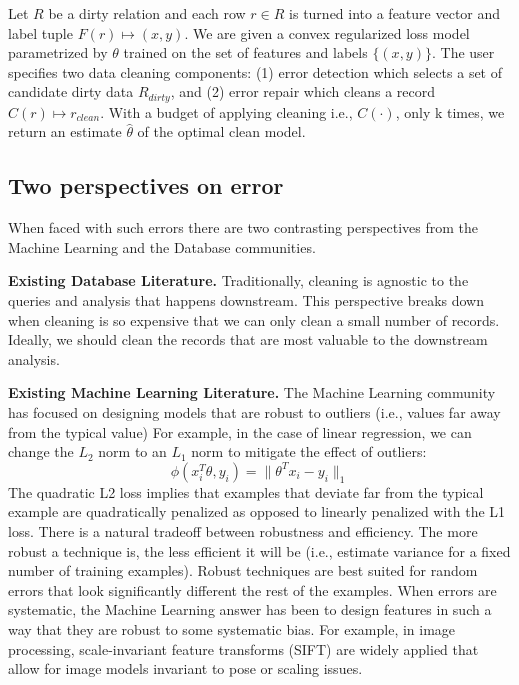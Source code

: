 \begin{problem}\label{activeclean}\sloppy
Let $R$ be a dirty relation and each row $r \in R$ is 
turned into a feature vector and label tuple $F(r) \mapsto (x,y)$.
We are given a convex regularized loss model parametrized
by $\theta$ trained on the set of features and labels $\{(x,y)\}$.
The user specifies two data cleaning components: (1) error detection
which selects a set of candidate dirty data $R_{dirty}$, and (2) error 
repair which cleans a record $C(r) \mapsto r_{clean}$.
With a budget of applying cleaning i.e., $C(\cdot)$, only k times, we return an estimate $\hat{\theta}$ of the optimal clean model.
\end{problem}

\iffalse

\subsection{Two perspectives on error}
When faced with such errors there are two contrasting perspectives from the Machine Learning and the Database communities.

\vspace{0.5em}

\noindent\textbf{Existing Database Literature. } 
Traditionally, cleaning is agnostic to the queries and analysis that happens downstream. 
This perspective breaks down when cleaning is so expensive that we can only clean a small number of records.
Ideally, we should clean the records that are most valuable to the downstream analysis.

\vspace{0.5em}

\noindent\textbf{Existing  Machine Learning Literature. } The Machine Learning community has focused on
designing models that are robust to outliers (i.e., values far away from the typical value)
For example, in the case of linear regression, we can change the $L_2$ norm to an $L_1$ norm to mitigate the effect of outliers:
\[
\phi(x_{i}^T\theta,y_{i}) = \|\theta^Tx_{i} - y_i \|_1
\]
The quadratic L2 loss implies that examples that deviate far from the typical example are quadratically penalized as opposed to linearly penalized with the L1 loss.
There is a natural tradeoff between robustness and efficiency.
The more robust a technique is, the less efficient it will be (i.e., estimate variance for a fixed number of training examples).
Robust techniques are best suited for random errors that look significantly different the rest of the examples.
When errors are systematic, the Machine Learning answer has been to design features in such a way that they are robust to some systematic bias.
For example, in image processing, scale-invariant feature transforms (SIFT) are widely applied that allow for image models invariant to pose or scaling issues.

